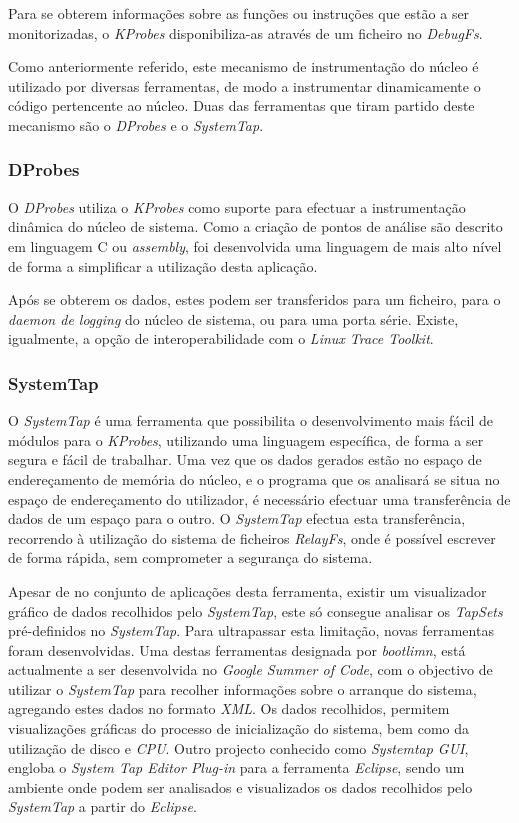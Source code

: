 Para se obterem informações sobre as funções ou instruções que estão a ser monitorizadas, o \textit{KProbes} disponibiliza-as através de um ficheiro no \textit{DebugFs}.

Como anteriormente referido, este mecanismo de instrumentação do núcleo é utilizado por diversas ferramentas, de modo a instrumentar dinamicamente o código pertencente ao núcleo.
Duas das ferramentas que tiram partido deste mecanismo são o \textit{DProbes} e o \textit{SystemTap}.

\subsubsection{DProbes}
O \textit{DProbes} utiliza o \textit{KProbes} como suporte para efectuar a instrumentação dinâmica do núcleo de sistema.
Como a criação de pontos de análise são descrito em linguagem C ou \textit{assembly}, foi desenvolvida uma linguagem de mais alto nível de forma a simplificar a utilização desta aplicação.

Após se obterem os dados, estes podem ser transferidos para um ficheiro, para o \textit{daemon de logging} do núcleo de sistema, ou para uma porta série.
Existe, igualmente, a opção de interoperabilidade com o \textit{Linux Trace Toolkit}\cite{DProbes}.

\subsubsection{SystemTap}
O \textit{SystemTap} é uma ferramenta que possibilita o desenvolvimento mais fácil de módulos para o \textit{KProbes}, utilizando uma linguagem específica, de forma a ser segura e fácil de trabalhar.
Uma vez que os dados gerados estão no espaço de endereçamento de memória do núcleo, e o programa que os analisará se situa no espaço de endereçamento do utilizador, é necessário efectuar uma transferência de dados de um espaço para o outro.
O \textit{SystemTap} efectua esta transferência, recorrendo à utilização do sistema de ficheiros \textit{RelayFs}, onde é possível escrever de forma rápida, sem comprometer a segurança do sistema\cite{Donovan2007,Jones2009,sys}.

Apesar de no conjunto de aplicações desta ferramenta, existir um visualizador gráfico de dados recolhidos pelo \textit{SystemTap}, este só consegue analisar os \textit{TapSets} pré-definidos no \textit{SystemTap}.
Para ultrapassar esta limitação, novas ferramentas foram desenvolvidas.
Uma destas ferramentas designada por \textit{bootlimn}, está actualmente a ser desenvolvida no \textit{Google Summer of Code}, com o objectivo de utilizar o \textit{SystemTap} para recolher informações sobre o arranque do sistema, agregando estes dados no formato \textit{XML}.
Os dados recolhidos, permitem visualizações gráficas do processo de inicialização do sistema, bem como da utilização de disco e \textit{CPU}.
Outro projecto conhecido como \textit{Systemtap GUI}, engloba o \textit{System Tap Editor Plug-in} para a ferramenta \textit{Eclipse}, sendo um ambiente onde podem ser analisados e visualizados os dados recolhidos pelo \textit{SystemTap} a partir do \textit{Eclipse}.

